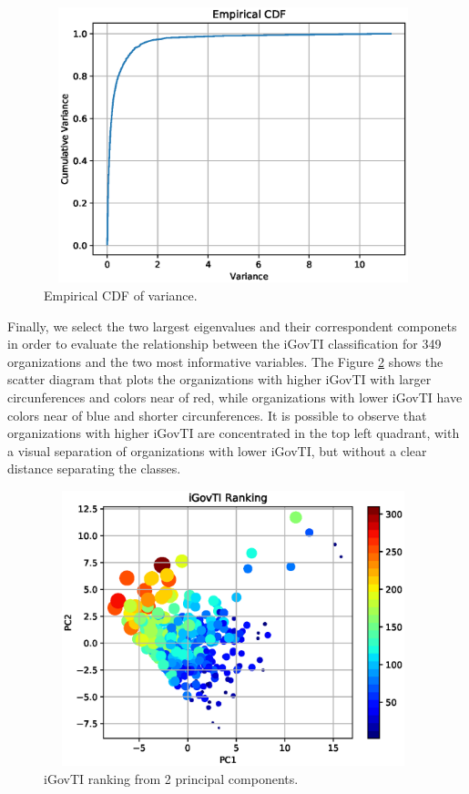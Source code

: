\begin{figure}[h!]
     \centering 
     \includegraphics[height=8cm, width=11cm]{figures/ch2/raw_variance_ecdf.eps}
     \caption{Empirical CDF of variance.}
     \label{fig:ch2_fig2}
\end{figure}
 
Finally, we select the two largest eigenvalues and their correspondent componets in order to evaluate the relationship between the iGovTI classification for 349 organizations and the two most informative variables. The Figure \ref{fig:ch2_fig3} shows the scatter diagram that plots the organizations with higher iGovTI with larger circunferences and colors near of red, while organizations with lower iGovTI have colors near of blue and shorter circunferences. It is possible to observe that organizations with higher iGovTI are concentrated in the top left quadrant, with a visual separation of organizations with lower iGovTI, but without a clear distance separating the classes.
 
\begin{figure}[h!]
     \centering 
     \includegraphics[height=8cm, width=11cm]{figures/ch2/raw_igovti_ranking_pc2.eps}
     \caption{iGovTI ranking from 2 principal components.}
     \label{fig:ch2_fig3}
\end{figure}

